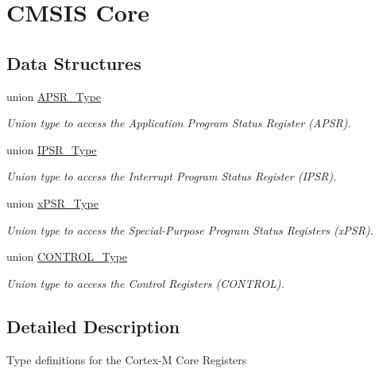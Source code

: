 \hypertarget{group___c_m_s_i_s___c_o_r_e}{\section{C\-M\-S\-I\-S Core}
\label{group___c_m_s_i_s___c_o_r_e}
}
\subsection*{Data Structures}
\begin{DoxyCompactItemize}
\item 
union \hyperlink{union_a_p_s_r___type}{A\-P\-S\-R\-\_\-\-Type}
\begin{DoxyCompactList}\small\item\em Union type to access the Application Program Status Register (A\-P\-S\-R). \end{DoxyCompactList}\item 
union \hyperlink{union_i_p_s_r___type}{I\-P\-S\-R\-\_\-\-Type}
\begin{DoxyCompactList}\small\item\em Union type to access the Interrupt Program Status Register (I\-P\-S\-R). \end{DoxyCompactList}\item 
union \hyperlink{unionx_p_s_r___type}{x\-P\-S\-R\-\_\-\-Type}
\begin{DoxyCompactList}\small\item\em Union type to access the Special-\/\-Purpose Program Status Registers (x\-P\-S\-R). \end{DoxyCompactList}\item 
union \hyperlink{union_c_o_n_t_r_o_l___type}{C\-O\-N\-T\-R\-O\-L\-\_\-\-Type}
\begin{DoxyCompactList}\small\item\em Union type to access the Control Registers (C\-O\-N\-T\-R\-O\-L). \end{DoxyCompactList}\end{DoxyCompactItemize}


\subsection{Detailed Description}
Type definitions for the Cortex-\/\-M Core Registers 